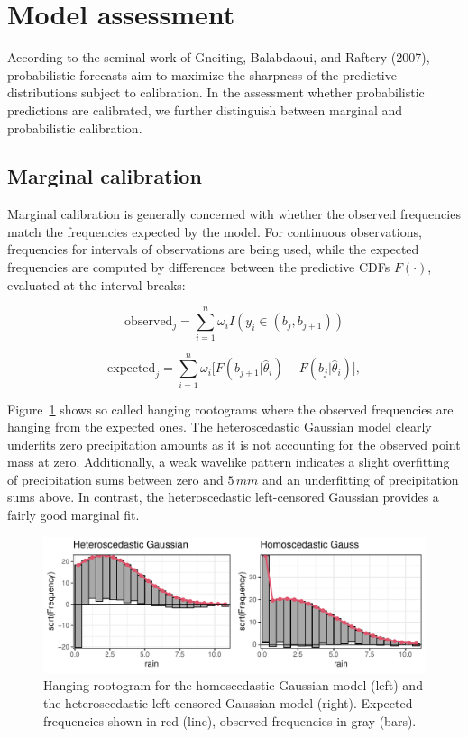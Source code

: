 \documentclass[twoside]{report}
\begin{document}
\section{Model assessment}

According to the seminal work of Gneiting, Balabdaoui, and Raftery (2007),
probabilistic forecasts aim to maximize the sharpness of the predictive
distributions subject to calibration. 
In the assessment whether probabilistic predictions are calibrated, we further
distinguish between marginal and probabilistic calibration.

\subsection{Marginal calibration}


Marginal calibration is generally concerned with whether the observed
frequencies match the frequencies expected by the model.  For continuous
observations, frequencies for intervals of observations are being used, while
the expected frequencies are computed by differences between the predictive
CDFs $F(\cdot)$, evaluated at the interval breaks:


$$
\text{observed}_j = \sum_{i=1}^n \omega_i I(y_i \in (b_j, b_{j+1}))
$$

$$
\text{expected}_j = \sum_{i=1}^n \omega_i \big[ F(b_{j+1} | \hat{\theta}_i) - F(b_{j} | \hat{\theta}_i) \big],
$$

Figure~\ref{stauffer:fig1} shows so called hanging rootograms where the
observed frequencies are hanging from the expected ones. The heteroscedastic
Gaussian model clearly underfits zero precipitation amounts as it is not
accounting for the observed point mass at zero.  Additionally, a weak wavelike
pattern indicates a slight overfitting of precipitation sums between zero and
$5\,mm$ and an underfitting of precipitation sums above. In contrast, the
heteroscedastic left-censored Gaussian provides a fairly good marginal fit.

\begin{figure}[!ht]\centering
    \includegraphics[width=\textwidth]{Stauffer-rootograms}
    \caption{\label{stauffer:fig1}
        Hanging rootogram for the homoscedastic Gaussian model (left)
        and the heteroscedastic left-censored Gaussian model (right).
        Expected frequencies shown in red (line), observed frequencies
        in gray (bars).
    }
\end{figure}
\end{document}
